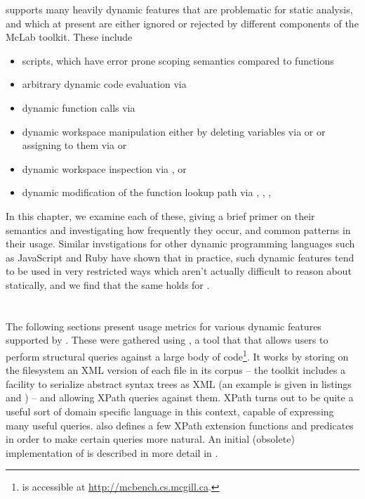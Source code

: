 \matlab supports many heavily dynamic features that are problematic for static
analysis, and which at present are either ignored or rejected by different
components of the McLab toolkit. These include

\begin{itemize}

\item scripts, which have error prone scoping semantics compared to functions

\item arbitrary dynamic code evaluation via 

\item dynamic function calls via 

\item dynamic workspace manipulation either by deleting variables via
 or  or assigning to them via  or

\item dynamic workspace inspection via ,  or 

\item dynamic modification of the function lookup path via ,
, , 

\end{itemize}

In this chapter, we examine each of these, giving a brief primer on their
semantics and investigating how frequently they occur, and common patterns in
their usage. Similar invstigations for other dynamic programming languages such
as JavaScript \cite{TheEvalThatMenDo} and Ruby \cite{ProfileGuidedStaticTyping}
have shown that in practice, such dynamic features tend to be used in very
restricted ways which aren't actually difficult to reason about statically,
and we find that the same holds for \matlab.

\section{\mcbench}


The following sections present usage metrics for various dynamic features
supported by \matlab. These were gathered using \mcbench, a tool that that
allows users to perform structural queries against a large body of \matlab
code\footnote{\mcbench is accessible at \url{http://mcbench.cs.mcgill.ca}.}. It
works by storing on the filesystem an XML version of each \matlab file in its
corpus -- the \mclab toolkit includes a facility to serialize \matlab abstract
syntax trees as XML (an example is given in listings 
and ) -- and allowing XPath queries against them. XPath
turns out to be quite a useful sort of domain specific language in this
context, capable of expressing many useful queries. \mcbench also defines a few
XPath extension functions and predicates in order to make certain queries more
natural. An initial (obsolete) implementation of \mcbench is described in more
detail in \cite{SoroushThesis}.


